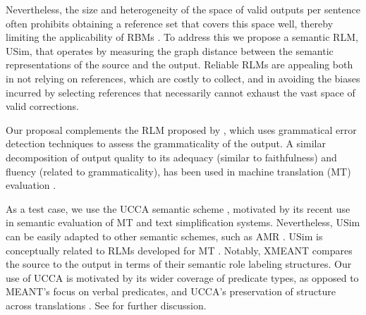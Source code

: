 \documentclass[a4paper, 11pt]{article}
\newcommand{\lc}[1]{\footnote{\color{blue}LC: #1}}
\begin{document}
Nevertheless, the size and heterogeneity of the space of valid outputs per sentence often prohibits
obtaining a reference set that covers this space well, thereby limiting the applicability
of RBMs \cite{bryant2015far}.
To address this we propose a semantic RLM, {\sc USim}, that
operates by measuring the graph distance between the semantic
representations of the source and the output.
Reliable RLMs are appealing both in not relying on references, which are costly to collect, and in avoiding the biases incurred by selecting references that necessarily cannot exhaust the vast space of valid corrections.

Our proposal complements the RLM proposed by 
, which uses grammatical error detection techniques to assess the grammaticality of the output.
A similar decomposition of output quality to its adequacy (similar to faithfulness)
and fluency (related to grammaticality), has been used in machine translation (MT)
evaluation \cite[e.g.,][]{banchs2015adequacy}.	

As a test case, we use the UCCA semantic scheme \cite{abend2013universal},
motivated by its recent use in semantic evaluation of MT \cite{birch2016hume} and text simplification \cite{sulem2018Semantic} systems.
Nevertheless, {\sc USim} can be easily adapted to other semantic schemes, such as AMR \cite{banarescu-EtAl:2013:LAW7-ID}.
{\sc USim} is conceptually related to RLMs developed
for MT
\cite{reeder2006measuring,albrecht2007regression,specia2009estimating,specia2010machine}.
Notably, XMEANT \cite{lo2014xmeant} compares the source to the output
in terms of their semantic role labeling structures.
Our use of UCCA is motivated by its wider coverage of predicate types, as opposed to 
MEANT's focus on verbal predicates, and UCCA's preservation
of structure across translations \cite{sulem2015conceptual}.
See \cite{birch2016hume} for further discussion. 


\end{document}
